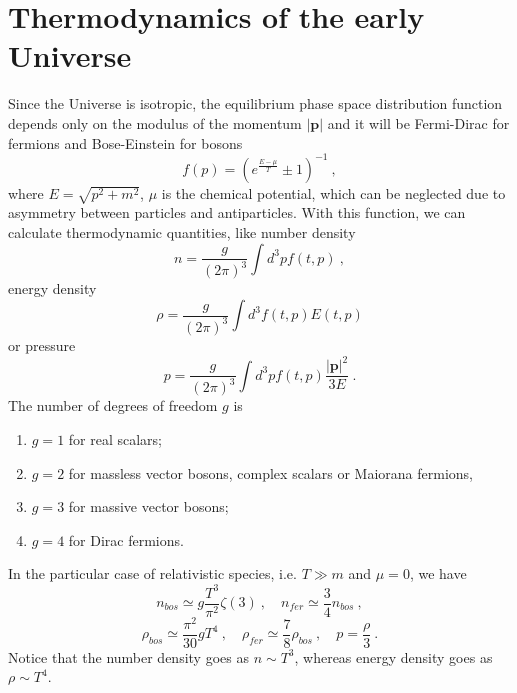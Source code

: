 \documentclass[a4paper]{article}
\begin{document}
    
\section{Thermodynamics of the early Universe}

    Since the Universe is isotropic, the equilibrium phase space distribution function depends only on the modulus of the momentum $|\mathbf p|$ and it will be Fermi-Dirac for fermions and Bose-Einstein for bosons
    \begin{equation*}
        f(p) = (e^{\frac{E - \mu}{T}} \pm 1)^{-1} ~,
    \end{equation*}
    where $E = \sqrt{p^2 + m^2}$, $\mu$ is the chemical potential, which can be neglected due to asymmetry between particles and antiparticles. With this function, we can calculate thermodynamic quantities, like number density
    \begin{equation*}
        n = \frac{g}{(2\pi)^3} \int d^3 p f(t, p) ~,
    \end{equation*}
    energy density
    \begin{equation*}
        \rho = \frac{g}{(2\pi)^3} \int d^3 f(t, p) E(t, p)
    \end{equation*}
    or pressure
    \begin{equation*}
        p = \frac{g}{(2\pi)^3} \int d^3 p f(t, p) \frac{|\mathbf p|^2}{3 E} ~.
    \end{equation*}
    The number of degrees of freedom $g$ is 
    \begin{enumerate}
        \item $g = 1$ for real scalars;
        \item $g=2$ for massless vector bosons, complex scalars or Maiorana fermions, 
        \item $g = 3$ for massive vector bosons;
        \item $g = 4$ for Dirac fermions.
    \end{enumerate}

    In the particular case of relativistic species, i.e. $T \gg m$ and $\mu = 0$, we have 
    \begin{equation*}
        n_{bos} \simeq g \frac{T^3}{\pi^2} \zeta (3) ~, \quad n_{fer} \simeq \frac{3}{4} n_{bos} ~,
    \end{equation*}
    \begin{equation*}
        \rho_{bos} \simeq \frac{\pi^2}{30} g T^4 ~, \quad \rho_{fer} \simeq \frac{7}{8} \rho_{bos} ~, \quad p = \frac{\rho}{3} ~.
    \end{equation*}
    Notice that the number density goes as $n \sim T^3$, whereas energy density goes as $\rho \sim T^4$.
\end{document}
